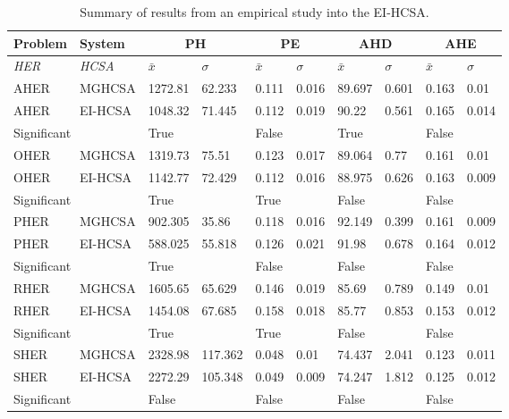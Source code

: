 \begin{table}[H]
	\centering\small
		\begin{tabular}{llllllllll}		
		\toprule
		\textbf{Problem} & \textbf{System} & \multicolumn{2}{c}{\textbf{PH}} & \multicolumn{2}{c}{\textbf{PE}} & \multicolumn{2}{c}{\textbf{AHD}} &\multicolumn{2}{c}{\textbf{AHE}} \\ 
		\midrule
		\emph{HER} & \emph{HCSA} & $\bar{x}$ & $\sigma$ & $\bar{x}$ & $\sigma$ & $\bar{x}$ & $\sigma$ & $\bar{x}$ & $\sigma$ \\ 
		\toprule
		AHER & MGHCSA & 1272.81 & 62.233 & 0.111 & 0.016 & 89.697 & 0.601 & 0.163 & 0.01 \\ 
		AHER & EI-HCSA & 1048.32 & 71.445 & 0.112 & 0.019 & 90.22 & 0.561 & 0.165 & 0.014 \\ 
		\multicolumn{2}{l}{Significant} & True &  & False &  & True &  & False &  \\ 
		\hline
		OHER & MGHCSA & 1319.73 & 75.51 & 0.123 & 0.017 & 89.064 & 0.77 & 0.161 & 0.01 \\ 
		OHER & EI-HCSA & 1142.77 & 72.429 & 0.112 & 0.016 & 88.975 & 0.626 & 0.163 & 0.009 \\ 
		\multicolumn{2}{l}{Significant} & True &  & True &  & False &  & False &  \\ 
		\midrule
		PHER & MGHCSA & 902.305 & 35.86 & 0.118 & 0.016 & 92.149 & 0.399 & 0.161 & 0.009 \\ 
		PHER & EI-HCSA & 588.025 & 55.818 & 0.126 & 0.021 & 91.98 & 0.678 & 0.164 & 0.012 \\ 
		\multicolumn{2}{l}{Significant} & True &  & False &  & False &  & False &  \\ 
		\midrule
		RHER & MGHCSA & 1605.65 & 65.629 & 0.146 & 0.019 & 85.69 & 0.789 & 0.149 & 0.01 \\ 
		RHER & EI-HCSA & 1454.08 & 67.685 & 0.158 & 0.018 & 85.77 & 0.853 & 0.153 & 0.012 \\ 
		\multicolumn{2}{l}{Significant} & True &  & True &  & False &  & False &  \\ 
		\midrule
		SHER & MGHCSA & 2328.98 & 117.362 & 0.048 & 0.01 & 74.437 & 2.041 & 0.123 & 0.011 \\ 
		SHER & EI-HCSA & 2272.29 & 105.348 & 0.049 & 0.009 & 74.247 & 1.812 & 0.125 & 0.012 \\ 
		\multicolumn{2}{l}{Significant} & False &  & False &  & False &  & False &  \\ 
		\bottomrule
		\end{tabular}	
	\caption{Summary of results from an empirical study into the EI-HCSA.}
	\label{tab:hosts:eihcsa:results}
\end{table}

